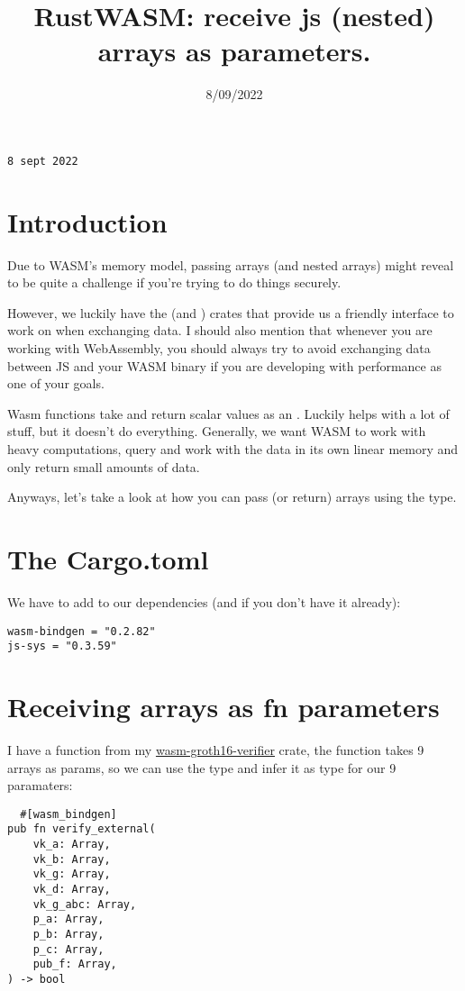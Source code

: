 \documentclass{article}
\title{RustWASM: receive js (nested) arrays as parameters.}
\date{8/09/2022}
\begin{document}
\maketitle

\texttt{8 sept 2022}

\section{Introduction}
Due to WASM's memory model, passing arrays (and nested arrays) might reveal to be quite a challenge if you're trying to do things securely.

However, we luckily have the  (and ) crates that provide us a friendly interface to work on when exchanging data. I should also mention that whenever you are working with WebAssembly, you should always try to avoid exchanging data between JS and your WASM binary if you are developing with performance as one of your goals.

Wasm functions take and return scalar values as an . Luckily  helps with a lot of stuff, but it doesn't do everything. Generally, we want WASM to work with heavy computations, query and work with the data in its own linear memory and only return small amounts of data.

Anyways, let's take a look at how you can pass (or return) arrays using the  type.

\section{The Cargo.toml}
We have to add  to our dependencies (and  if you don't have it already):

\begin{lstlisting}
wasm-bindgen = "0.2.82"
js-sys = "0.3.59"
\end{lstlisting}

\section{Receiving arrays as fn parameters}
I have a  function from my \href{https://github.com/heytdep/wasm-groth16-verifier}{wasm-groth16-verifier} crate, the function takes 9 arrays as params, so we can use the  type and infer it as type for our 9 paramaters:

\begin{lstlisting}
  #[wasm_bindgen]
pub fn verify_external(
    vk_a: Array,
    vk_b: Array,
    vk_g: Array,
    vk_d: Array,
    vk_g_abc: Array,
    p_a: Array,
    p_b: Array,
    p_c: Array,
    pub_f: Array,
) -> bool
\end{lstlisting}
\end{document}
